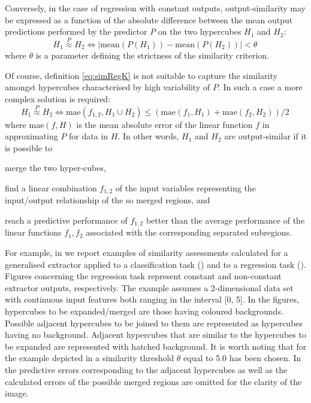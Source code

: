 \documentclass[
]{ceurart}
\begin{document}
Conversely, in the case of regression with constant outputs, output-similarity may be expressed as a function of the absolute difference between the mean output predictions performed by the predictor $P$ on the two hypercubes $H_1$ and $H_2$:
%
\begin{equation}\label{eq:simRegK}
	H_1 \stackrel{P}{\approx} H_2 \Leftrightarrow |\text{mean}(P(H_1)) - \text{mean}(P(H_2))| < \theta\,
\end{equation}
%
where $\theta$ is a parameter defining the strictness of the similarity criterion.

Of course, definition \ref{eq:simRegK} is not suitable to capture the similarity amongst hypercubes characterised by high variability of $P$.
%
In such a case a more complex solution is required:
%
\begin{equation}\label{eq:simRegLin}
	H_1 \stackrel{P}{\approx} H_2 \Leftrightarrow \text{mae}(f_{1,2}, H_1 \cup H_2) \leq (\text{mae}(f_1, H_1) + \text{mae}(f_2, H_2)) / 2 \,
\end{equation}
%
where $\text{mae}(f, H)$ is the mean absolute error of the linear function $f$ in approximating 
$P$ for data in $H$.
%
In other words, $H_1$ and $H_2$ are output-similar if it is possible to
%
\begin{inlinelist}
	\item merge the two hyper-cubes, %
	\item find a linear combination $f_{1,2}$ of the input variables representing the input/output relationship of the so merged regions, and
	\item reach a predictive performance of $f_{1,2}$ better than the average performance of the linear functions $f_1, f_2$ associated with the corresponding separated subregions.
\end{inlinelist}



For example, in  we report examples of similarity assessments calculated for a generalised extractor applied to a classification task () and to a regression task ().
%
Figures concerning the regression task represent constant and non-constant extractor outputs, respectively.
%
The example assumes a 2-dimensional data set with continuous input features both ranging in the interval [0, 5].
%
In the figures, hypercubes to be expanded/merged are those having coloured backgrounds.
%
Possible adjacent hypercubes to be joined to them are represented as hypercubes having no background.
%
Adjacent hypercubes that are similar to the hypercubes to be expanded are represented with hatched background.
%
It is worth noting that for the example depicted in  a similarity threshold $\theta$ equal to 5.0 has been chosen.
%
In  the predictive errors corresponding to the adjacent hypercubes as well as the calculated errors of the possible merged regions are omitted for the clarity of the image.
\end{document}
